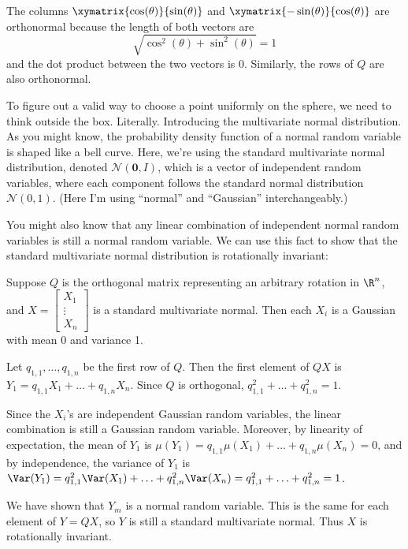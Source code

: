 \documentclass{article}
\begin{document}
The columns $\xymatrix{\cos(\theta)}{\sin(\theta)}$ and $\xymatrix{-\sin(\theta)}{\cos(\theta)}$ are orthonormal because the length of both vectors are
\[
    \sqrt{\cos^2(\theta) + \sin^2(\theta)} = 1
\]
and the dot product between the two vectors is 0. Similarly, the rows of $Q$ are also orthonormal.


To figure out a valid way to choose a point uniformly on the sphere, we need to think outside the box. Literally. Introducing the multivariate normal distribution. As you might know, the probability density function of a normal random variable is shaped like a bell curve. Here, we're using the standard multivariate normal distribution, denoted $\mathcal{N}(\mathbf{0}, I)$, which is a vector of independent random variables, where each component follows the standard normal distribution $\mathcal{N}(0, 1)$. (Here I'm using ``normal'' and ``Gaussian'' interchangeably.)

You might also know that any linear combination of independent normal random variables is still a normal random variable. We can use this fact to show that the standard multivariate normal distribution is rotationally invariant:

Suppose $Q$ is the orthogonal matrix representing an arbitrary rotation in $\R^n$, and
$X = \begin{bmatrix}
        X_1 \\ \vdots \\ X_n
    \end{bmatrix}$ is a standard multivariate normal. Then each $X_i$ is a Gaussian with mean 0 and variance 1.

Let $q_{1,1}, \ldots, q_{1,n}$ be the first row of $Q$. Then the first element of $QX$ is $Y_1 = q_{1,1} X_1 + \ldots + q_{1,n} X_n$. Since $Q$ is orthogonal, $q_{1,1}^2 + \ldots + q_{1,n}^2 = 1$.

Since the $X_i$'s are independent Gaussian random variables, the linear combination is still a Gaussian random variable. Moreover, by linearity of expectation, the mean of $Y_1$ is $\mu(Y_1) = q_{1,1} \mu(X_1) + \ldots + q_{1,n} \mu(X_n) = 0$, and by independence, the variance of $Y_1$ is $\Var(Y_1) = q_{1,1}^2 \Var(X_1) + \ldots + q_{1,n}^2 \Var(X_n) = q_{1,1}^2 + \ldots + q_{1,n}^2 = 1$.

We have shown that $Y_m$ is a normal random variable. This is the same for each element of $Y = QX$, so $Y$ is still a standard multivariate normal. Thus $X$ is rotationally invariant.
\end{document}
